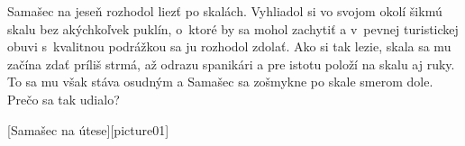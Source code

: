 Samašec na jeseň rozhodol liezť po skalách. Vyhliadol si vo svojom okolí
šikmú skalu bez akýchkoľvek puklín, o~ktoré by sa mohol zachytiť a
v~pevnej turistickej obuvi s~kvalitnou podrážkou sa ju rozhodol zdolať.
Ako si tak lezie, skala sa mu začína zdať príliš strmá, až odrazu
spanikári a pre istotu položí na skalu aj ruky. To sa mu však stáva
osudným a Samašec sa zošmykne po skale smerom dole. Prečo sa tak udialo?

[Samašec na útese][picture01]
